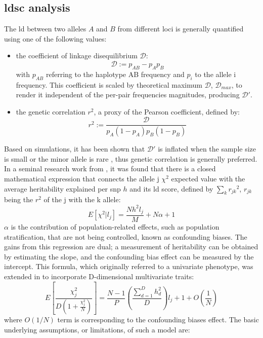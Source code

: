 \subsection{\Ac{ldsc} analysis}

The \ac{ld} between two alleles $A$ and $B$ from different loci is generally quantified using one of the following values: 
\begin{itemize}
\item{
the coefficient of linkage disequilibrium $\mathcal{D}$:
$$
\mathcal{D} := p_{AB} - p_Ap_B
$$
with $p_{AB}$ referring to the haplotype AB frequency and $p_i$ to the allele i frequency. This coefficient is scaled by theoretical maximum $\mathcal{D}$, $\mathcal{D}_{max}$, to render it independent of the per-pair frequencies magnitudes, producing $\mathcal{D}'$.
}
\item{
the genetic correlation $r^2$, a proxy of the Pearson coefficient, defined by:
$$
r^2:= \frac{\mathcal{D}}{p_A(1-p_A)p_B(1-p_B)}
$$
}
\end{itemize}
Based on simulations, it has been shown that $\mathcal{D}'$ is inflated when the sample size is small or the minor allele is rare \cite{Teare2002}, thus genetic correlation is generally preferred.  In a seminal research work from \citet{Bulik-Sullivan2015}, it was found that there is a closed mathematical expression that connects the allele j $\chi^2$ expected value  with the average heritability explained per \ac{snp} $h$ and its \ac{ld} score, defined by $\sum_k{{r_{jk}}^2}$, $r_{jk}$ being the $r^2$ of the j with the k allele:
$$
E[\chi^2|l_j] = \frac{Nh^2l_j}{M} + N\alpha + 1
$$
$\alpha$ is the contribution of population-related effects, such as population stratification, that are not being controlled, known as confounding biases. The gains from this regression are dual; a measurement of heritability can be obtained by estimating the slope, and the confounding bias effect can be measured by the intercept. This formula, which originally referred to a univariate phenotype, was extended in \cite{Naqvi2021} to incorporate D-dimensional multivariate traits:
$$
E\left[\frac{\chi^2_j}{D\left(1+\frac{\chi^2_j}{N}\right)}\right] = \frac{N-1}{P}\left(\frac{\sum_{d=1}^{D}h_d^2}{D}\right)l_j +1 + O\left(\frac{1}{N}\right)
$$
where $O(1/N)$ term is corresponding to the confounding biases effect.
The basic underlying assumptions, or limitations, of such a model are:
